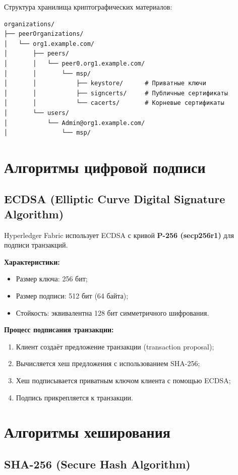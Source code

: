 \documentclass[a4paper,14pt]{extreport}
\begin{document}
Структура хранилища криптографических материалов:
\begin{verbatim}
organizations/
├── peerOrganizations/
│   └── org1.example.com/
│       ├── peers/
│       │   └── peer0.org1.example.com/
│       │       └── msp/
│       │           ├── keystore/      # Приватные ключи
│       │           ├── signcerts/     # Публичные сертификаты
│       │           └── cacerts/       # Корневые сертификаты
│       └── users/
│           └── Admin@org1.example.com/
│               └── msp/
\end{verbatim}

\section{Алгоритмы цифровой подписи}

\subsection{ECDSA (Elliptic Curve Digital Signature Algorithm)}

Hyperledger Fabric использует ECDSA с кривой \textbf{P-256 (secp256r1)} для подписи транзакций.

\textbf{Характеристики:}
\begin{itemize}
    \item Размер ключа: 256 бит;
    \item Размер подписи: 512 бит (64 байта);
    \item Стойкость: эквивалентна 128 бит симметричного шифрования.
\end{itemize}

\textbf{Процесс подписания транзакции:}
\begin{enumerate}
    \item Клиент создаёт предложение транзакции (transaction proposal);
    \item Вычисляется хеш предложения с использованием SHA-256;
    \item Хеш подписывается приватным ключом клиента с помощью ECDSA;
    \item Подпись прикрепляется к транзакции.
\end{enumerate}

\section{Алгоритмы хеширования}

\subsection{SHA-256 (Secure Hash Algorithm)}
\end{document}
